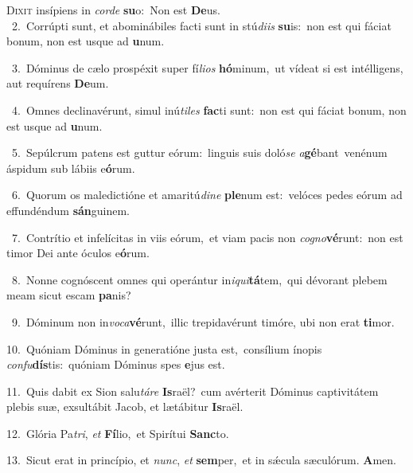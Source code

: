\lettrine{\initial\textcolor{\initialcolor}{D}}{ixit} insípiens in \textit{cor}\-\textit{de} \textbf{su}\-o:~\star Non est \textbf{De}\-us.\\
{\numbfont\textcolor{\numbcolor}{~2.}}~Corrúpti sunt, et abominábiles facti sunt in stú\-\textit{di}\-\textit{is} \textbf{su}\-is:~\star non est qui fáciat bonum, non est usque ad \textbf{u}\-num.\par
{\numbfont\textcolor{\numbcolor}{~3.}}~Dóminus de cælo prospéxit super fí\-\textit{li}\-\textit{os} \textbf{hó}\-minum,~\star ut vídeat si est intélligens, aut requírens \textbf{De}\-um.\par
{\numbfont\textcolor{\numbcolor}{~4.}}~Omnes declinavérunt, simul inú\-\textit{ti}\-\textit{les} \textbf{fac}\-ti sunt:~\star non est qui fáciat bonum, non est usque ad \textbf{u}\-num.\par
{\numbfont\textcolor{\numbcolor}{~5.}}~Sepúlcrum patens est guttur eórum:~\dagger linguis suis doló\textit{se} \textit{a}\-\textbf{gé}bant~\star venénum áspidum sub lábiis e\-\textbf{ó}\-rum.\par
{\numbfont\textcolor{\numbcolor}{~6.}}~Quorum os maledictióne et amaritú\-\textit{di}\-\textit{ne} \textbf{ple}\-num est:~\star velóces pedes eórum ad effundéndum \textbf{sán}\-guinem.\par
{\numbfont\textcolor{\numbcolor}{~7.}}~Contrítio et infelícitas in viis eórum,~\dagger et viam pacis non \textit{co}\-\textit{gno}\textbf{vé}runt:~\star non est timor Dei ante óculos e\-\textbf{ó}\-rum.\par
{\numbfont\textcolor{\numbcolor}{~8.}}~Nonne cognóscent omnes qui operántur in\-\textit{i}\-\textit{qui}\textbf{tá}tem,~\star qui dévorant plebem meam sicut escam \textbf{pa}\-nis?\par
{\numbfont\textcolor{\numbcolor}{~9.}}~Dóminum non in\-\textit{vo}\-\textit{ca}\textbf{vé}runt,~\star illic trepidavérunt timóre, ubi non erat \textbf{ti}\-mor.\par
{\numbfont\textcolor{\numbcolor}{10.}}~Quóniam Dóminus in generatióne justa est,~\dagger consílium ínopis \textit{con}\-\textit{fu}\textbf{dís}tis:~\star quóniam Dóminus spes \textbf{e}\-jus est.\par
{\numbfont\textcolor{\numbcolor}{11.}}~Quis dabit ex Sion salu\-\textit{tá}\-\textit{re} \textbf{Is}\-raël?~\star cum avérterit Dóminus captivitátem plebis suæ, exsultábit Jacob, et lætábitur \textbf{Is}\-raël.\par
{\numbfont\textcolor{\numbcolor}{12.}}~Glória Pa\-\textit{tri}\-, \textit{et} \textbf{Fí}\-lio,~\star et Spirítui \textbf{Sanc}\-to.\par
{\numbfont\textcolor{\numbcolor}{13.}}~Sicut erat in princípio, et \textit{nunc}\-, \textit{et} \textbf{sem}\-per,~\star et in sǽcula sæculórum. \textbf{A}\-men.\par
